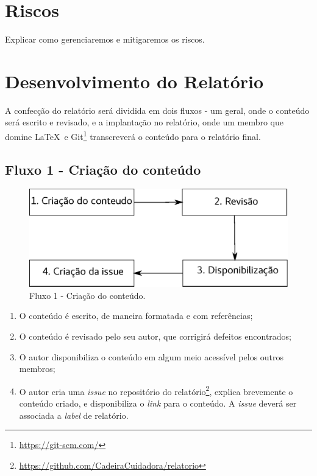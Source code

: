 \section{Riscos}

Explicar como gerenciaremos e mitigaremos os riscos.

\section{Desenvolvimento do Relatório}

A confecção do relatório será dividida em dois fluxos - um geral, onde o
conteúdo será escrito e revisado, e a implantação no relatório, onde um
membro que domine \LaTeX\ e
Git\footnote{\url{https://git-scm.com/}} transcreverá o conteúdo para o
relatório final.

\subsection{Fluxo 1 - Criação do conteúdo}

\begin{figure}[H]
  \centering
    \includegraphics[width=\textwidth]{figuras/fluxo1.eps}
  \caption{Fluxo 1 - Criação do conteúdo.}
  \label{fig:fluxo1}
\end{figure}

\begin{enumerate}
  \item O conteúdo é escrito, de maneira formatada e com referências;
  \item O conteúdo é revisado pelo seu autor, que corrigirá defeitos encontrados;
  \item O autor disponibiliza o conteúdo em algum meio acessível pelos outros membros;
  \item O autor cria uma \textit{issue} no repositório do
    relatório\footnote{\url{https://github.com/CadeiraCuidadora/relatorio}}, explica brevemente
    o conteúdo criado, e disponibiliza o \textit{link} para o conteúdo. A \textit{issue} deverá ser associada a \textit{label} de relatório.
\end{enumerate}

